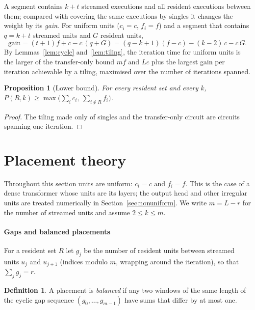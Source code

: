 \documentclass[final,5p,times,twocolumn]{elsarticle}
\newtheorem{proposition}{Proposition}
\theoremstyle{definition}
\newtheorem{definition}{Definition}
\newcommand{\Res}{R}
\newcommand{\per}{P}
\begin{document}
A segment contains $k+t$ streamed executions and all resident executions between them; compared with covering the same executions by singles it changes the weight by its \emph{gain}. For uniform units ($c_i=c$, $f_i=f$) and a segment that contains $q=k+t$ streamed units and $G$ resident units,
\begin{equation}
\mathrm{gain} = (t+1)f + c - c\,(q+G) = (q-k+1)(f-c) - (k-2)\,c - c\,G. \label{eq:gain}
\end{equation}
By Lemmas~\ref{lem:cycle} and~\ref{lem:tiling}, the iteration time for uniform units is the larger of the transfer-only bound $mf$ and $Lc$ plus the largest gain per iteration achievable by a tiling, maximised over the number of iterations spanned.

\begin{proposition}[Lower bound]\label{prop:lb}
For every resident set and every $k$, $\per(\Res,k)\ge \max\bigl(\sum_i c_i,\ \sum_{i\notin\Res} f_i\bigr)$.
\end{proposition}
\begin{proof}
The tiling made only of singles and the transfer-only circuit are circuits spanning one iteration.
\end{proof}

\section{Placement theory}
\label{sec:theory}

Throughout this section units are uniform: $c_i=c$ and $f_i=f$. This is the case of a dense transformer whose units are its layers; the output head and other irregular units are treated numerically in Section~\ref{sec:nonuniform}. We write $m=L-r$ for the number of streamed units and assume $2\le k\le m$.

\paragraph{Gaps and balanced placements}
For a resident set $\Res$ let $g_j$ be the number of resident units between streamed units $u_j$ and $u_{j+1}$ (indices modulo $m$, wrapping around the iteration), so that $\sum_j g_j = r$.

\begin{definition}
A placement is \emph{balanced} if any two windows of the same length of the cyclic gap sequence $(g_0,\dots,g_{m-1})$ have sums that differ by at most one.
\end{definition}
\end{document}
